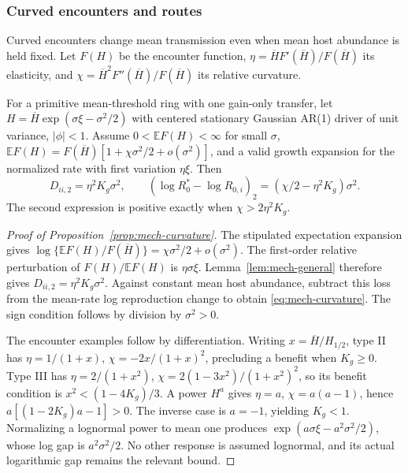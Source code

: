 \subsubsection{Curved encounters and routes}\label{app:mech-routes}
Curved encounters change mean transmission even when mean host abundance is held fixed. Let \(F(H)\) be the encounter function, \(\eta=\overline HF'(\overline H)/F(\overline H)\) its elasticity, and \(\chi=\overline H^2F''(\overline H)/F(\overline H)\) its relative curvature.

\begin{proposition}\label{prop:mech-curvature}
For a primitive mean-threshold ring with one gain-only transfer, let \(H=\overline H\exp(\sigma\xi-\sigma^2/2)\) with centered stationary Gaussian AR(1) driver of unit variance, \(|\phi|<1\). Assume \(0<\mathbb EF(H)<\infty\) for small \(\sigma\), \(\mathbb EF(H)=F(\overline H)[1+\chi\sigma^2/2+o(\sigma^2)]\), and a valid growth expansion for the normalized rate with first variation \(\eta\xi\). Then
\begin{equation}\label{eq:mech-curvature}
 D_{ii,2}=\eta^2K_g\sigma^2,\qquad
 (\log R_0^*-\log R_{0,i})_2=(\chi/2-\eta^2K_g)\sigma^2.
\end{equation}
The second expression is positive exactly when \(\chi>2\eta^2K_g\).
\end{proposition}

\begin{proof}[Proof of Proposition~\ref{prop:mech-curvature}]
The stipulated expectation expansion gives
\(\log\{\mathbb EF(H)/F(\overline H)\}=\chi\sigma^2/2+o(\sigma^2)\).
The first-order relative perturbation of \(F(H)/\mathbb EF(H)\) is \(\eta\sigma\xi\). Lemma~\ref{lem:mech-general} therefore gives \(D_{ii,2}=\eta^2K_g\sigma^2\). Against constant mean host abundance, subtract this loss from the mean-rate log reproduction change to obtain \eqref{eq:mech-curvature}. The sign condition follows by division by \(\sigma^2>0\).

The encounter examples follow by differentiation. Writing \(x=\overline H/H_{1/2}\), type II has \(\eta=1/(1+x)\), \(\chi=-2x/(1+x)^2\), precluding a benefit when \(K_g\geq0\). Type III has \(\eta=2/(1+x^2)\), \(\chi=2(1-3x^2)/(1+x^2)^2\), so its benefit condition is \(x^2<(1-4K_g)/3\). A power \(H^a\) gives \(\eta=a\), \(\chi=a(a-1)\), hence \(a[(1-2K_g)a-1]>0\). The inverse case is \(a=-1\), yielding \(K_g<1\). Normalizing a lognormal power to mean one produces \(\exp(a\sigma\xi-a^2\sigma^2/2)\), whose log gap is \(a^2\sigma^2/2\). No other response is assumed lognormal, and its actual logarithmic gap remains the relevant bound.
\end{proof}

